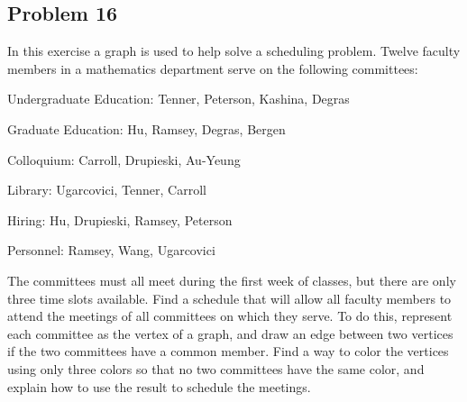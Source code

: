 \documentclass[14pt]{extarticle}
\begin{document}
\subsection{Problem 16}
In this exercise a graph is used to help solve a scheduling problem. Twelve
faculty members in a mathematics department serve on the following
committees:

Undergraduate Education: Tenner, Peterson, Kashina, Degras

Graduate Education: Hu, Ramsey, Degras, Bergen

Colloquium: Carroll, Drupieski, Au-Yeung

Library: Ugarcovici, Tenner, Carroll

Hiring: Hu, Drupieski, Ramsey, Peterson

Personnel: Ramsey, Wang, Ugarcovici

The committees must all meet during the first week of classes, but there are
only three time slots available. Find a schedule that will allow all faculty
members to attend the meetings of all committees on which they serve. To do
this, represent each committee as the vertex of a graph, and draw an edge
between two vertices if the two committees have a common member. Find a way to
color the vertices using only three colors so that no two committees have the
same color, and explain how to use the result to schedule the meetings.
\end{document}
